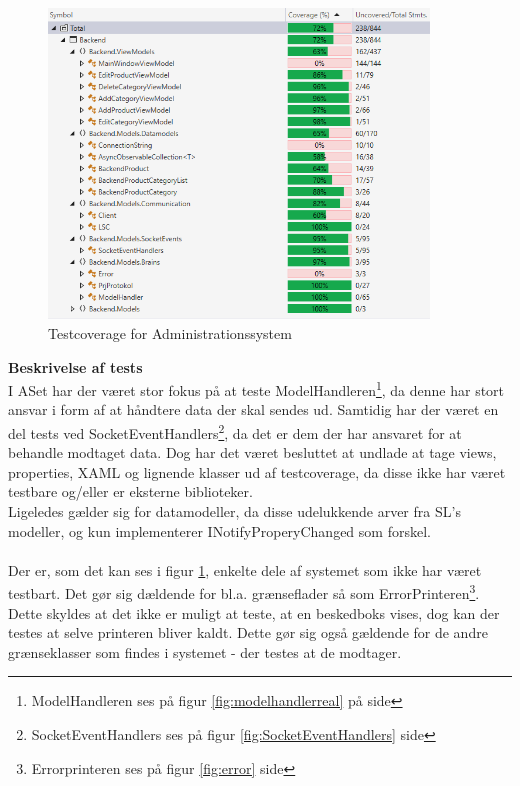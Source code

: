 \begin{figure}[H]
	\centering
	\includegraphics[width=0.90\textwidth]{Test/Images/Backend/Coverage.png}
	\caption{Testcoverage for Administrationssystem}
	\label{fig:cover}
	\end{figure}
	

	
\textbf{Beskrivelse af tests}\\
I \gls{AS}et har der været stor fokus på at teste ModelHandleren\footnote{ModelHandleren ses på figur \ref{fig:modelhandlerreal} på side \pageref{fig:modelhandlerreal}}, da denne har stort ansvar i form af at håndtere data der skal sendes ud. Samtidig har der været en del tests ved SocketEventHandlers\footnote{SocketEventHandlers ses på figur \ref{fig:SocketEventHandlers} side \pageref{fig:SocketEventHandlers}}, da det er dem der har ansvaret for at behandle modtaget data. Dog har det været besluttet at undlade at tage views, properties, XAML og lignende klasser ud af testcoverage, da disse ikke har været testbare og/eller er eksterne biblioteker.\\
 Ligeledes gælder sig for datamodeller, da disse udelukkende arver fra \gls{SL}'s modeller, og kun implementerer INotifyProperyChanged som forskel. \\
 \\
 Der er, som det kan ses i figur \ref{fig:cover}, enkelte dele af systemet som ikke har været testbart. Det gør sig dældende for bl.a. grænseflader så som ErrorPrinteren\footnote{Errorprinteren ses på figur \ref{fig:error} side \pageref{fig:error}}. Dette skyldes at det ikke er muligt at teste, at en beskedboks vises, dog kan der testes at selve printeren bliver kaldt. Dette gør sig også gældende for de andre grænseklasser som findes i systemet - der testes at de modtager.